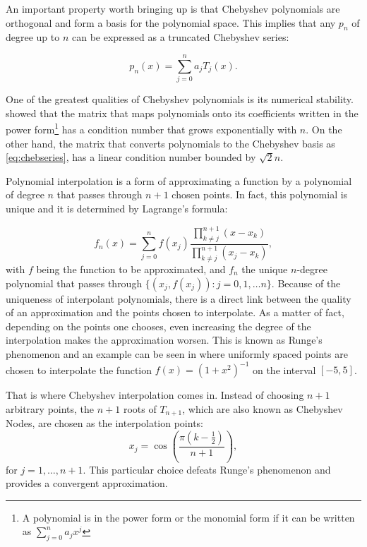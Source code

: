 An important property worth bringing up is that Chebyshev polynomials are orthogonal and form a basis for the polynomial space. This implies that any $p_n$ of degree up to $n$ can be expressed as a truncated Chebyshev series:

\begin{equation}\label{eq:chebseries}
p_n(x) = \sum_{j=0}^{n} a_j T_j(x).
\end{equation}

One of the greatest qualities of Chebyshev polynomials is its numerical stability.  showed that the matrix that maps polynomials onto its coefficients written in the power form\footnote{A polynomial is in the power form or the monomial form if it can be written as $\sum_{j=0}^{n}a_jx^j$} has a condition number that grows exponentially with $n$. On the other hand, the matrix that converts polynomials to the Chebyshev basis as \autoref{eq:chebseries}, has a linear condition number bounded by $\sqrt{2}n$.

Polynomial interpolation is a form of approximating a function by a polynomial of degree $n$ that passes through $n+1$ chosen points. In fact, this polynomial is unique and it is determined by Lagrange's formula:

\begin{equation}\label{eq:lagrange}
f_n(x) = \sum_{j=0}^{n} f(x_j)\dfrac{\prod_{k \neq j}^{n+1} (x-x_k)}{\prod_{k \neq j}^{n+1} (x_j-x_k)},
\end{equation} 
with $f$ being the function to be approximated, and $f_n$ the unique $n$-degree polynomial that passes through $\{(x_j, f(x_j)): j=0, 1, \dots n\}$. Because of the uniqueness of interpolant polynomials, there is a direct link between the quality of an approximation and the points chosen to interpolate. As a matter of fact, depending on the points one chooses, even increasing the degree of the interpolation makes the approximation worsen. This is known as Runge's phenomenon and an example can be seen in  where uniformly spaced points are chosen to interpolate the function $f(x) = (1+x^2)^{-1}$ on the interval $[-5, 5]$. 

That is where Chebyshev interpolation comes in. Instead of choosing $n+1$ arbitrary points, the $n+1$ roots of $T_{n+1}$, which are also known as Chebyshev Nodes, are chosen as the interpolation points:
\begin{equation}
x_j = \cos{\left(\dfrac{\pi(k-\frac{1}{2})}{n+1}\right)},
\end{equation}
for $j=1, \dots, n+1$. This particular choice defeats Runge's phenomenon and provides a convergent approximation. 

